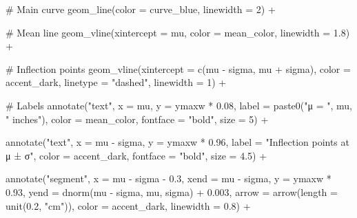 \documentclass[
  letterpaper,
  DIV=11,
  numbers=noendperiod]{scrreprt}
\newenvironment{Shaded}{\begin{snugshade}}{\end{snugshade}}
\newcommand{\AttributeTok}[1]{\textcolor[rgb]{0.40,0.45,0.13}{#1}}
\newcommand{\CommentTok}[1]{\textcolor[rgb]{0.37,0.37,0.37}{#1}}
\newcommand{\DecValTok}[1]{\textcolor[rgb]{0.68,0.00,0.00}{#1}}
\newcommand{\FloatTok}[1]{\textcolor[rgb]{0.68,0.00,0.00}{#1}}
\newcommand{\FunctionTok}[1]{\textcolor[rgb]{0.28,0.35,0.67}{#1}}
\newcommand{\NormalTok}[1]{\textcolor[rgb]{0.00,0.23,0.31}{#1}}
\newcommand{\SpecialCharTok}[1]{\textcolor[rgb]{0.37,0.37,0.37}{#1}}
\newcommand{\StringTok}[1]{\textcolor[rgb]{0.13,0.47,0.30}{#1}}
\begin{document}
\begin{Shaded}
\begin{Highlighting}[]
  \CommentTok{\# Main curve}
  \FunctionTok{geom\_line}\NormalTok{(}\AttributeTok{color =}\NormalTok{ curve\_blue, }\AttributeTok{linewidth =} \DecValTok{2}\NormalTok{) }\SpecialCharTok{+}
  
  \CommentTok{\# Mean line}
  \FunctionTok{geom\_vline}\NormalTok{(}\AttributeTok{xintercept =}\NormalTok{ mu, }\AttributeTok{color =}\NormalTok{ mean\_color, }\AttributeTok{linewidth =} \FloatTok{1.8}\NormalTok{) }\SpecialCharTok{+}
  
  \CommentTok{\# Inflection points}
  \FunctionTok{geom\_vline}\NormalTok{(}\AttributeTok{xintercept =} \FunctionTok{c}\NormalTok{(mu }\SpecialCharTok{{-}}\NormalTok{ sigma, mu }\SpecialCharTok{+}\NormalTok{ sigma), }
             \AttributeTok{color =}\NormalTok{ accent\_dark, }\AttributeTok{linetype =} \StringTok{"dashed"}\NormalTok{, }\AttributeTok{linewidth =} \DecValTok{1}\NormalTok{) }\SpecialCharTok{+}
  
  \CommentTok{\# Labels}
  \FunctionTok{annotate}\NormalTok{(}\StringTok{"text"}\NormalTok{, }\AttributeTok{x =}\NormalTok{ mu, }\AttributeTok{y =}\NormalTok{ ymaxw }\SpecialCharTok{*} \FloatTok{0.08}\NormalTok{, }
           \AttributeTok{label =} \FunctionTok{paste0}\NormalTok{(}\StringTok{"μ = "}\NormalTok{, mu, }\StringTok{" inches"}\NormalTok{), }
           \AttributeTok{color =}\NormalTok{ mean\_color, }\AttributeTok{fontface =} \StringTok{"bold"}\NormalTok{, }\AttributeTok{size =} \DecValTok{5}\NormalTok{) }\SpecialCharTok{+}
  
  \FunctionTok{annotate}\NormalTok{(}\StringTok{"text"}\NormalTok{, }\AttributeTok{x =}\NormalTok{ mu }\SpecialCharTok{{-}}\NormalTok{ sigma, }\AttributeTok{y =}\NormalTok{ ymaxw }\SpecialCharTok{*} \FloatTok{0.96}\NormalTok{, }
           \AttributeTok{label =} \StringTok{"Inflection points at μ ± σ"}\NormalTok{, }
           \AttributeTok{color =}\NormalTok{ accent\_dark, }\AttributeTok{fontface =} \StringTok{"bold"}\NormalTok{, }\AttributeTok{size =} \FloatTok{4.5}\NormalTok{) }\SpecialCharTok{+}
  
  \FunctionTok{annotate}\NormalTok{(}\StringTok{"segment"}\NormalTok{, }\AttributeTok{x =}\NormalTok{ mu }\SpecialCharTok{{-}}\NormalTok{ sigma }\SpecialCharTok{{-}} \FloatTok{0.3}\NormalTok{, }\AttributeTok{xend =}\NormalTok{ mu }\SpecialCharTok{{-}}\NormalTok{ sigma, }
           \AttributeTok{y =}\NormalTok{ ymaxw }\SpecialCharTok{*} \FloatTok{0.93}\NormalTok{, }\AttributeTok{yend =} \FunctionTok{dnorm}\NormalTok{(mu }\SpecialCharTok{{-}}\NormalTok{ sigma, mu, sigma) }\SpecialCharTok{+} \FloatTok{0.003}\NormalTok{,}
           \AttributeTok{arrow =} \FunctionTok{arrow}\NormalTok{(}\AttributeTok{length =} \FunctionTok{unit}\NormalTok{(}\FloatTok{0.2}\NormalTok{, }\StringTok{"cm"}\NormalTok{)), }
           \AttributeTok{color =}\NormalTok{ accent\_dark, }\AttributeTok{linewidth =} \FloatTok{0.8}\NormalTok{) }\SpecialCharTok{+}
  

\end{Highlighting}
\end{Shaded}
\end{document}
